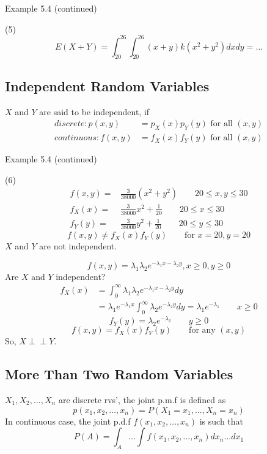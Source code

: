 \begin{exmp}
Example 5.4 (continued)

(5)
\[E(X+Y)=\int_{20}^{26}\int_{20}^{26}(x+y) k(x^2+y^2) dx dy=\dots\]
\end{exmp}

\subsection{Independent Random Variables}
$X$ and $Y$ are said to be independent, if 
\begin{align*}
discrete: p(x,y)&=p_X(x)p_Y(y) \text{ for all }(x,y)\\
continuous: f(x,y)&=f_X(x)f_Y(y) \text{ for all }(x,y)
\end{align*}

\begin{exmp}
Example 5.4 (continued)

(6)
\begin{align*}
f(x,y) =& \frac{3}{38000} (x^2+y^2) \qquad 20 \leq x,y \leq 30\\
f_X(x) =&  \frac{3}{38000}x^2+\frac{1}{20} \qquad 20 \leq x \leq 30 \\
f_Y(y) =&  \frac{3}{38000}y^2+\frac{1}{20} \qquad 20 \leq y \leq 30
\end{align*}
\[f(x,y)\neq f_X(x)f_Y(y) \qquad \text{for } x=20, y=20\]
$X$ and $Y$ are not independent. 
\end{exmp}

\begin{exmp}
\[f(x,y)=\lambda_1\lambda_2 e^{-\lambda_1 x - \lambda_2 y}, x\geq0,y\geq0\]
Are $X$ and $Y$ independent?
\begin{align*}
f_X(x)&=\int_{0}^{\infty} \lambda_1 \lambda_2 e^{-\lambda_1 x-\lambda_2 y} dy \\
&=\lambda_1 e^{-\lambda_1 x} \int_{0}^{\infty} \lambda_2 e^{-\lambda_2 y} dy = \lambda_1 e^{-\lambda_1} \qquad x \geq 0
\end{align*}
\[f_Y(y)=\lambda_2 e^{-\lambda_2} \qquad y \geq 0\]
\[f(x,y)= f_X(x)f_Y(y) \qquad \text{for any } (x,y)\]
So, $X \!\perp\!\!\!\perp Y$.
\end{exmp}


\subsection{More Than Two Random Variables}
\begin{defn}
$X_1,X_2,\dots,X_n$ are discrete rvs', the joint p.m.f is defined as
\[p(x_1,x_2,\dots,x_n)=P(X_1=x_1,\dots ,X_n=x_n)\]
In continuous case, the joint p.d.f $f(x_1,x_2,\dots,x_n)$ is such that
\[P(A) =\int_A\dots\int f(x_1,x_2,\dots,x_n) d x_n \dots d x_1\]
\end{defn}

